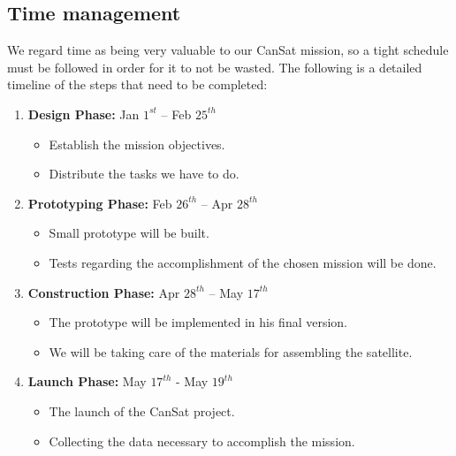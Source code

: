 \documentclass[11pt]{article}
\begin{document}
\subsection{Time management}
\hspace{0.5cm} We regard time as being very valuable to our CanSat mission, so a tight schedule must be followed in order for it to not be wasted. The following is a detailed timeline of the steps that need to be completed:
\begin{enumerate}
\item \textbf{Design Phase:} Jan $1^{st}$ – Feb $25^{th}$

\begin{itemize}
\item Establish the mission objectives.
\item Distribute the tasks we have to do.
\end{itemize}

\item \textbf{Prototyping Phase:} Feb $26^{th}$ – Apr $28^{th}$

\begin{itemize}
\item Small prototype will be built.
\item Tests regarding the accomplishment of the chosen mission will be done.
\end{itemize}

\item \textbf{Construction Phase:} Apr $28^{th}$ – May $17^{th}$

\begin{itemize}
\item The prototype will be implemented in his final version.
\item We will be taking care of the materials for assembling the satellite.
\end{itemize}

\item \textbf{Launch Phase:} May $17^{th}$ - May $19^{th}$

\begin{itemize}
\item The launch of the CanSat project.
\item Collecting the data necessary to accomplish the mission.
\end{itemize}

\end{enumerate}
\end{document}
